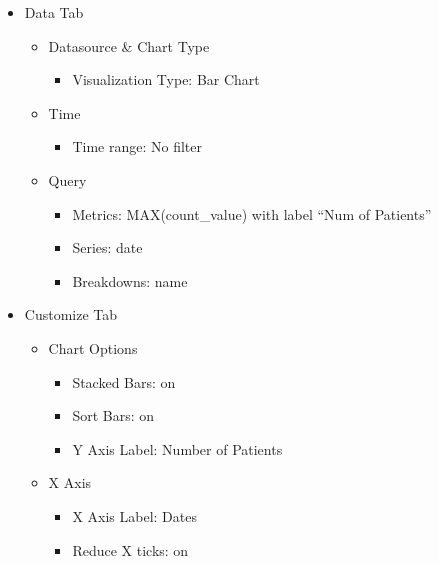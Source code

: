 \documentclass[
]{book}
\providecommand{\tightlist}{%
  \setlength{\itemsep}{0pt}\setlength{\parskip}{0pt}}
\begin{document}
\begin{itemize}
\tightlist
\item
  Data Tab

  \begin{itemize}
  \tightlist
  \item
    Datasource \& Chart Type

    \begin{itemize}
    \tightlist
    \item
      Visualization Type: Bar Chart
    \end{itemize}
  \item
    Time

    \begin{itemize}
    \tightlist
    \item
      Time range: No filter
    \end{itemize}
  \item
    Query

    \begin{itemize}
    \tightlist
    \item
      Metrics: MAX(count\_value) with label ``Num of Patients''
    \item
      Series: date
    \item
      Breakdowns: name
    \end{itemize}
  \end{itemize}
\item
  Customize Tab

  \begin{itemize}
  \tightlist
  \item
    Chart Options

    \begin{itemize}
    \tightlist
    \item
      Stacked Bars: on
    \item
      Sort Bars: on
    \item
      Y Axis Label: Number of Patients
    \end{itemize}
  \item
    X Axis

    \begin{itemize}
    \tightlist
    \item
      X Axis Label: Dates
    \item
      Reduce X ticks: on
    \end{itemize}
  \end{itemize}
\end{itemize}
\end{document}
